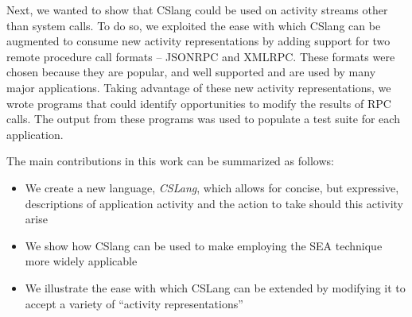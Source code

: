 Next, we wanted to
show that CSlang
could be used on activity streams
other than system calls.
To do so,
we exploited the ease with which
CSlang can be augmented
to consume new activity representations
by adding support for two remote procedure call formats -- JSONRPC and XMLRPC.
These formats were chosen
because they are popular,
and well supported and are
used by many major applications.
Taking advantage of these new activity representations,
we wrote programs
that could identify opportunities
to modify the results of RPC calls.
The output from these programs was used to populate a test suite
for each application.

The main contributions in this work can be summarized as follows:

\begin{itemize}

\item{We create a new language, {\em CSLang},
  which allows for concise, but expressive, descriptions of
    application activity and the action to take should this activity arise}

\item{We show how CSlang can be used to make employing the SEA technique
  more widely applicable}

\item{We illustrate the ease with which CSLang can be extended by modifying
  it to accept a variety of ``activity representations''}

\end{itemize}


